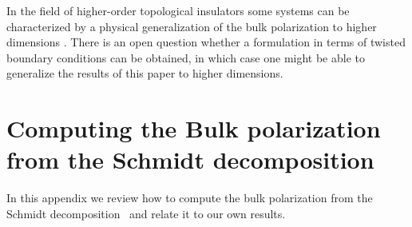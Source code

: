 \documentclass[twocolumn,amsmath,longbibliography,amssymb,superscriptaddress]{revtex4-1}
\begin{document}
In the field of higher-order topological insulators some systems can be characterized by a physical generalization of the bulk polarization to higher dimensions \cite{Benalcazar2017,Kang2019}. There is an open question whether a formulation in terms of twisted boundary conditions can be obtained, in which case one might be able to generalize the results of this paper to higher dimensions.


	

	
\appendix


\section{Computing the Bulk polarization from the Schmidt decomposition}\label{app:pollmann}

In this appendix we review  how to compute the bulk polarization from the Schmidt decomposition~\cite{Zaletel2014} and relate it to our own results.
\end{document}
